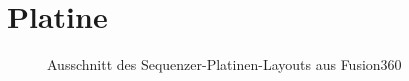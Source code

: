 \section{Platine}
\begin{figure}[h]
	\centering
	\setlength{\fboxsep}{1pt} %
	\setlength{\fboxrule}{1pt} %
	\caption{Ausschnitt des Sequenzer-Platinen-Layouts aus Fusion360}
	\label{fig:PCB_SEQ}
\end{figure}
\FloatBarrier
\newpage

